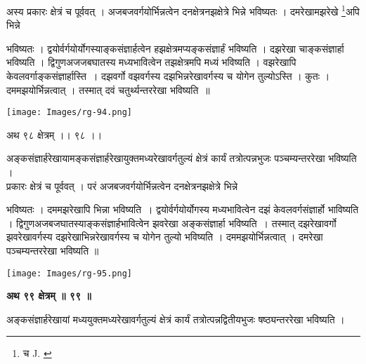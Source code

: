 \documentclass[11pt, openany]{book}
\begin{document}
अस्य प्रकारः क्षेत्रं च पूर्ववत् । अजबजवर्गयोर्भिन्नत्वेन
दनक्षेत्रनझक्षेत्रे भिन्ने भविष्यतः । दमरेखामझरेखे \renewcommand{\thefootnote}{१}\footnote{च {\en J. }}अपि भिन्ने 
\begin{vwcol}[widths={0.6,0.4}, sep=.8cm, rule=0pt]
भविष्यतः । द्वयोर्वर्गयोर्योगस्याङ्कसंज्ञार्हत्वेन हझक्षेत्रमप्यङ्कसंज्ञार्हं भविष्यति । दझरेखा चाङ्कसंज्ञार्हा भविष्यति ।
द्विगुणअजजबघातस्य मध्यभावित्वेन तझक्षेत्रमपि मध्यं भविष्यति । वझरेखापि केवलवर्गाङ्कसंज्ञार्हास्ति~। दझवर्गो वझवर्गस्य दझभिन्नरेखावर्गस्य च योगेन तुल्योऽस्ति । कुतः । दममझयोर्भिन्नत्वात् । तस्मात् दवं चतुर्थ्यन्तररेखा भविष्यति~॥ \\
\vspace{5mm}

\noindent \texttt{[image: Images/rg-94.png]}
\end{vwcol}
\vspace{2mm}

\begin{center}
{\large अथ ९८ क्षेत्रम् ।। ९८ ।।}
\end{center}
\vspace{2mm}

{\ab अङ्कसंज्ञार्हरेखायामङ्कसंज्ञार्हरेखायुक्तमध्यरेखावर्गतुल्यं क्षेत्रं
कार्यं तत्रोत्पन्नभुजः पञ्चम्यन्तररेखा भविष्यति । }\\


प्रकारः क्षेत्रं च पूर्ववत् । परं अजबजवर्गयोर्भिन्नत्वेन
दनक्षेत्रनझक्षेत्रे भिन्ने 
\begin{vwcol}[widths={0.65,0.4}, sep=.8cm, rule=0pt]
भविष्यतः । दममझरेखापि भिन्ना
भविष्यति~। द्वयोर्वर्गयोर्योगस्य मध्यभावित्वेन दझं केवलवर्गसंज्ञार्हो भाविष्यति ।
द्विगुणअजबजघातस्याङ्कसंज्ञार्हभावित्वेन झवरेखा अङ्कसंज्ञार्हा भविष्यति~। तस्मात् दझरेखावर्गो झवरेखावर्गस्य दझरेखाभिन्नरेखावर्गस्य च योगेन तुल्यो भविष्यति । दममझयोर्भिन्नत्वात् । दमरेखा पञ्चम्यन्तररेखा भविष्यति ॥ 
\vspace{4mm}

\noindent \texttt{[image: Images/rg-95.png]}
\end{vwcol}
\vspace{-2mm}

\newpage
\begin{center}
\textbf{\large अथ ९९ क्षेत्रम् ॥ ९९ ॥}
\end{center}
\vspace{2mm}

 {\ab अङ्कसंज्ञार्हरेखायां मध्ययुक्तमध्यरेखावर्गतुल्यं क्षेत्रं कार्यं
तत्रोत्पन्नद्वितीयभुजः षष्ठ्यन्तररेखा भविष्यति । }\\
\end{document}
